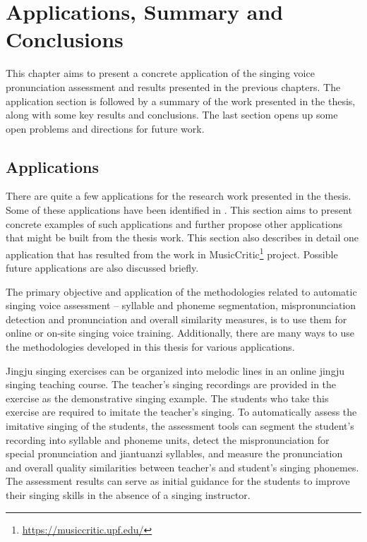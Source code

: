 \chapter{Applications, Summary and Conclusions}\label{chap:conclusions}

This chapter aims to present a concrete application of the singing voice pronunciation assessment and results presented in the previous chapters. The application section is followed by a summary of the work presented in the thesis, along with some key results and conclusions. The last section opens up some open problems and directions for future work. 

\section{Applications}

There are quite a few applications for the research work presented in the thesis. Some of these applications have been identified in . This section aims to present concrete examples of such applications and further propose other applications that might be built from the thesis work. This section also describes in detail one application that has resulted from the work in MusicCritic\footnote{\url{https://musiccritic.upf.edu/}} project. Possible future applications are also discussed briefly.

The primary objective and application of the methodologies related to automatic singing voice assessment -- syllable and phoneme segmentation, mispronunciation detection and pronunciation and overall similarity measures, is to use them for online or on-site singing voice training. Additionally, there are many ways to use the methodologies developed in this thesis for various applications.

Jingju singing exercises can be organized into melodic lines in an online jingju singing teaching course. The teacher's singing recordings are provided in the exercise as the demonstrative singing example. The students who take this exercise are required to imitate the teacher's singing. To automatically assess the imitative singing of the students, the assessment tools can segment the student's recording into syllable and phoneme units, detect the mispronunciation for special pronunciation and jiantuanzi syllables, and measure the pronunciation and overall quality similarities between teacher's and student's singing phonemes. The assessment results can serve as initial guidance for the students to improve their singing skills in the absence of a singing instructor.

